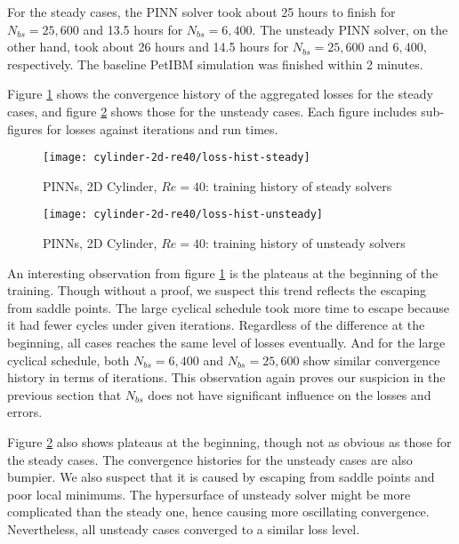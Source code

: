 
For the steady cases, the PINN solver took about 25 hours to finish for $N_{bs}=25,600$ and 13.5 hours for $N_{bs}=6,400$.
The unsteady PINN solver, on the other hand, took about 26 hours and 14.5 hours for $N_{bs}=25,600$ and $6,400$, respectively.
The baseline PetIBM simulation was finished within 2 minutes.

Figure \ref{fig:cylinder-2d-re40-loss-hist-steady} shows the convergence history of the aggregated losses for the steady cases, and figure \ref{fig:cylinder-2d-re40-loss-hist-unsteady} shows those for the unsteady cases.
Each figure includes sub-figures for losses against iterations and run times.
\begin{figure}[hbt!]
    \texttt{[image: cylinder-2d-re40/loss-hist-steady]}
    \caption[%
        PINNs, 2D Cylinder, $Re=40$: training history of steady solvers%
    ]{%
        PINNs, 2D Cylinder, $Re=40$: training history of steady solvers%
    }%
    \label{fig:cylinder-2d-re40-loss-hist-steady}
\end{figure}
\begin{figure}[hbt!]
    \texttt{[image: cylinder-2d-re40/loss-hist-unsteady]}
    \caption[%
        PINNs, 2D Cylinder, $Re=40$: training history of unsteady solvers%
    ]{%
        PINNs, 2D Cylinder, $Re=40$: training history of unsteady solvers%
    }%
    \label{fig:cylinder-2d-re40-loss-hist-unsteady}
\end{figure}
An interesting observation from figure \ref{fig:cylinder-2d-re40-loss-hist-steady} is the plateaus at the beginning of the training.
Though without a proof, we suspect this trend reflects the escaping from saddle points.
The large cyclical schedule took more time to escape because it had fewer cycles under given iterations.
Regardless of the difference at the beginning, all cases reaches the same level of losses eventually.
And for the large cyclical schedule, both $N_{bs}=6,400$ and $N_{bs}=25,600$ show similar convergence history in terms of iterations.
This observation again proves our suspicion in the previous section that $N_{bs}$ does not have significant influence on the losses and errors.

Figure \ref{fig:cylinder-2d-re40-loss-hist-unsteady} also shows plateaus at the beginning, though not as obvious as those for the steady cases.
The convergence histories for the unsteady cases are also bumpier.
We also suspect that it is caused by escaping from saddle points and poor local minimums.
The hypersurface of unsteady solver might be more complicated than the steady one, hence causing more oscillating convergence.
Nevertheless, all unsteady cases converged to a similar loss level.


